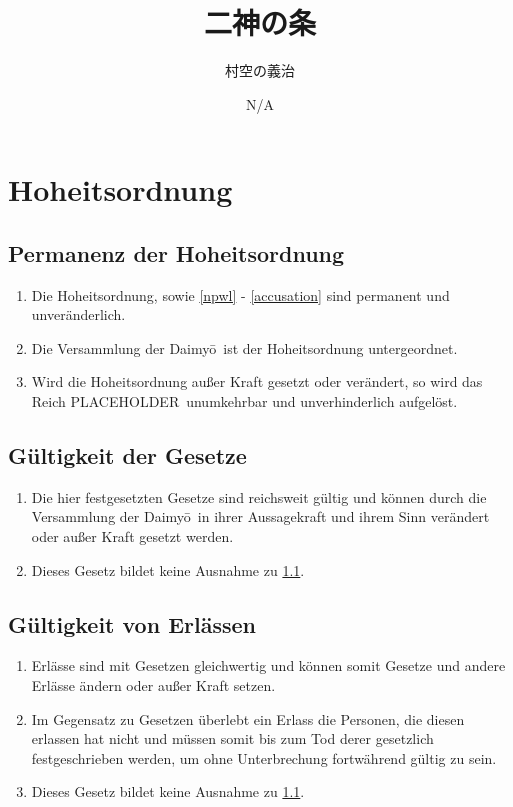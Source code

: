\documentclass{article}
\title{二神の条}
\author{村空の義治}
\date{N/A}
\newcommand{\longO}{ō}
\newcommand{\pl}{PLACEHOLDER\ }
\newcommand{\state}{\pl}
\begin{document}
\maketitle\newpage
\section{Hoheitsordnung}
\subsection{Permanenz der Hoheitsordnung}\label{permanency}
\begin{enumerate}
    \item Die Hoheitsordnung, sowie \ref{npwl} - \ref{accusation} sind permanent und unveränderlich.
    \item Die Versammlung der Daimy\longO\ ist der Hoheitsordnung untergeordnet.
    \item Wird die Hoheitsordnung außer Kraft gesetzt oder verändert, so wird das Reich \state unumkehrbar und unverhinderlich aufgelöst.
\end{enumerate}

\subsection{Gültigkeit der Gesetze}
\begin{enumerate}
    \item Die hier festgesetzten Gesetze sind reichsweit gültig und können durch die Versammlung der Daimy\longO\ in ihrer Aussagekraft und ihrem Sinn verändert oder außer Kraft gesetzt werden.
    \item Dieses Gesetz bildet keine Ausnahme zu \ref{permanency}.
\end{enumerate}

\subsection{Gültigkeit von Erlässen}
\begin{enumerate}
    \item Erlässe sind mit Gesetzen gleichwertig und können somit Gesetze und andere Erlässe ändern oder außer Kraft setzen.
    \item Im Gegensatz zu Gesetzen überlebt ein Erlass die Personen, die diesen erlassen hat nicht und müssen somit bis zum Tod derer gesetzlich festgeschrieben werden, um ohne Unterbrechung fortwährend gültig zu sein.
    \item Dieses Gesetz bildet keine Ausnahme zu \ref{permanency}.
\end{enumerate}
\end{document}
